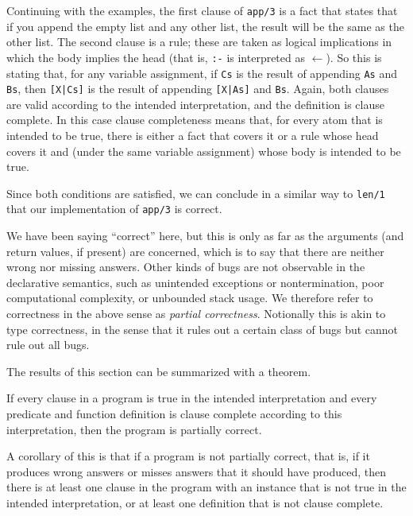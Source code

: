 Continuing with the examples,
the first clause of \texttt{app/3} is a fact that states that
if you append the empty list and any other list,
the result will be the same as the other list.
The second clause is a rule;
these are taken as logical implications
in which the body implies the head
(that is, \texttt{:-} is interpreted as $\leftarrow$).
So this is stating that, for any variable assignment,
if \texttt{Cs} is the result of appending \texttt{As} and \texttt{Bs},
then \texttt{[X|Cs]} is the result of
appending \texttt{[X|As]} and \texttt{Bs}.
Again, both clauses are valid according to the intended interpretation,
and the definition is clause complete.
In this case clause completeness means that,
for every atom that is intended to be true,
there is either a fact that covers it
or a rule whose head covers it and
(under the same variable assignment)
whose body is intended to be true.

Since both conditions are satisfied,
we can conclude in a similar way to \texttt{len/1}
that our implementation of \texttt{app/3} is correct.

We have been saying ``correct'' here,
but this is only as far as the arguments
(and return values, if present)
are concerned,
which is to say that there are neither wrong nor missing answers.
Other kinds of bugs are not observable in the declarative semantics,
such as \mbox{unintended} exceptions or nontermination,
poor computational complexity,
or unbounded stack usage.
We therefore refer to correctness in the above sense
as \emph{partial correctness\label{gi:partial-correctness}}.
Notionally this is akin to type correctness,
in the sense that it rules out a certain class of bugs
but cannot rule out all bugs.

The results of this section can be summarized with a theorem.

\begin{theorem} \label{thm:partial-correctness}
If every clause in a program is true in the intended interpretation
and every predicate and function definition is clause complete
according to this interpretation,
then the program is partially correct.
\end{theorem}

\noindent
A corollary of this is that if a program is not partially correct,
that is, if it produces wrong answers
or misses answers that it should have produced,
then there is at least one clause in the program
with an instance that is not true in the intended interpretation,
or at least one definition that is not clause complete.

